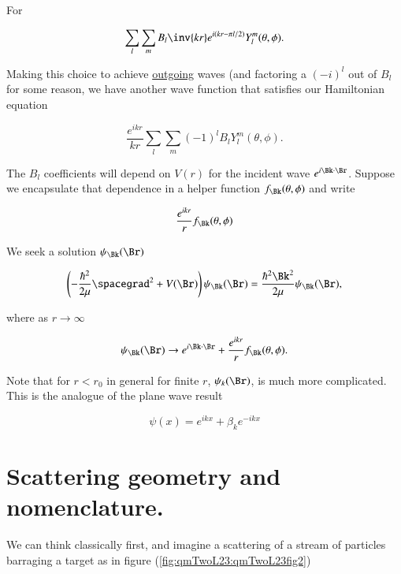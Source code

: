 For

\begin{equation}\label{eqn:qmTwoL23:540}
\sum_l
\sum_m B_l
\inv{k r} e^{i (k r - \pi l/2)} Y_l^m(\theta, \phi).
\end{equation}

Making this choice to achieve \underline{outgoing} waves (and factoring a $(-i)^l$ out of $B_l$ for some reason, we have another wave function that satisfies our Hamiltonian equation

\begin{equation}\label{eqn:qmTwoL23:560}
\frac{e^{i k r}}{k r}
\sum_l
\sum_m
(-1)^l
B_l
Y_l^m(\theta, \phi).
\end{equation}

The $B_l$ coefficients will depend on $V(r)$ for the incident wave $e^{i \Bk \cdot \Br}$.  Suppose we encapsulate that dependence in a helper function $f_\Bk(\theta, \phi)$ and write

\begin{equation}\label{eqn:qmTwoL23:580}
\frac{e^{i k r}}{r} f_\Bk(\theta, \phi)
\end{equation}

We seek a solution $\psi_\Bk(\Br)$

\begin{equation}\label{eqn:qmTwoL23:60b}
\left( - \frac{\hbar^2}{2\mu} \spacegrad^2
+ V(\Br)
\right)
\psi_\Bk(\Br)
 = \frac{\hbar^2 \Bk^2}{2 \mu}
\psi_\Bk(\Br),
\end{equation}

where as $r \rightarrow \infty$

\begin{equation}\label{eqn:qmTwoL23:600}
\psi_\Bk(\Br) \rightarrow e^{i \Bk \cdot \Br} + \frac{e^{i k r}}{r} f_\Bk(\theta, \phi).
\end{equation}

Note that for $r < r_0$ in general for finite $r$, $\psi_k(\Br)$, is much more complicated.  This is the analogue of the plane wave result

\begin{equation}\label{eqn:qmTwoL23:620}
\psi(x) = e^{i k x} + \beta_k e^{-i k x}
\end{equation}


\section{Scattering geometry and nomenclature.}

We can think classically first, and imagine a scattering of a stream of particles barraging a target as in
figure (\ref{fig:qmTwoL23:qmTwoL23fig2})

